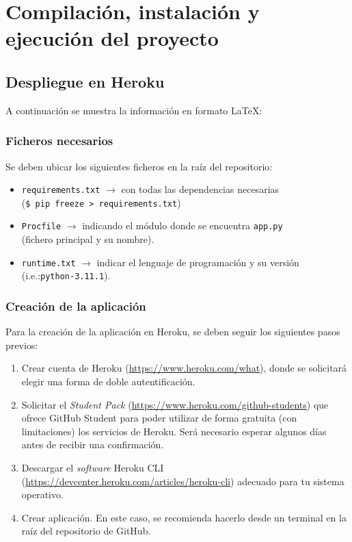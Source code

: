\section{Compilación, instalación y ejecución del proyecto}

\subsection{Despliegue en Heroku}
A continuación se muestra la información en formato LaTeX:


\subsubsection{Ficheros necesarios}
Se deben ubicar los siguientes ficheros en la raíz del repositorio:
\begin{itemize}
    \item \texttt{requirements.txt} $\to$ con todas las dependencias necesarias \\
    (\texttt{\$ pip freeze > requirements.txt})
    \item \texttt{Procfile} $\to$ indicando el módulo donde se encuentra \texttt{app.py} \\
    (fichero principal y su nombre).
    \item \texttt{runtime.txt} $\to$ indicar el lenguaje de programación y su versión (i.e.:\texttt{python-3.11.1}).
\end{itemize}

\subsubsection{Creación de la aplicación}
Para la creación de la aplicación en Heroku, se deben seguir los siguientes pasos previos:

\begin{enumerate}
    \item Crear cuenta de Heroku (\url{https://www.heroku.com/what}), donde se solicitará elegir una forma de doble autentificación.
    \item Solicitar el \textit{Student Pack} (\url{https://www.heroku.com/github-students}) que ofrece GitHub Student para poder utilizar de forma gratuita (con limitaciones) los servicios de Heroku. Será necesario esperar algunos días antes de recibir una confirmación.
    \item Descargar el \textit{software} Heroku CLI (\url{https://devcenter.heroku.com/articles/heroku-cli}) adecuado para tu sistema operativo.
    \item Crear aplicación. En este caso, se recomienda hacerlo desde un terminal en la raíz del repositorio de GitHub.
\end{enumerate}

